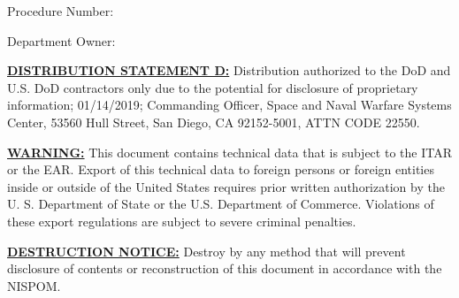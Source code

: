 \begin{titlepage}

    \vspace*{1in}

    \begin{flushright}
        {\Huge\textbf{\titleStr}}

        \vspace*{1ex}

        {\Large Procedure Number:~\procedureNumber}

        \vspace*{1ex}

        {\Large Department Owner:~\departmentOwner}
    \end{flushright}
    \vspace{4in}

    \textbf{\underline{DISTRIBUTION STATEMENT D:}} Distribution authorized to the \acs{DoD} and U.S. \acs{DoD} contractors only due to the potential for disclosure of proprietary information; 01/14/2019; Commanding Officer, Space and Naval Warfare Systems Center, 53560 Hull Street, San Diego, CA 92152-5001, ATTN CODE 22550.

    \textbf{\underline{WARNING:}} This document contains technical data that is subject to the \ac{ITAR} or the \ac{EAR}. Export of this technical data to foreign persons or foreign entities inside or outside of the United States requires prior written authorization by the U. S. Department of State or the U.S. Department of Commerce. Violations of these export regulations are subject to severe criminal penalties.

    \textbf{\underline{DESTRUCTION NOTICE:}} Destroy by any method that will prevent disclosure of contents or reconstruction of this document in accordance with the \ac{NISPOM}.


\end{titlepage}
